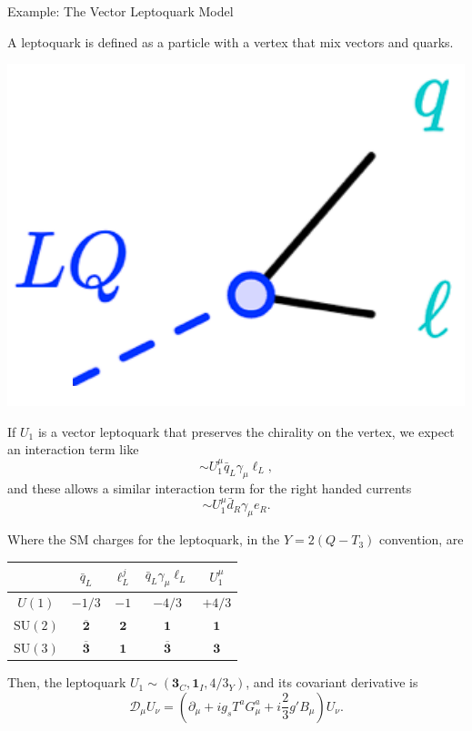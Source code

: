 \documentclass{../bredelebeamer}
\begin{document}
\begin{frame}{Example: The Vector Leptoquark Model}
    \begin{multicols}{2}
        A leptoquark is defined as a particle with a vertex that mix vectors and quarks.
        \begin{center}
        \includegraphics[width=.25\textwidth]{../2023_paper/LQ_vertex.png}
        \end{center}
        If $U_1$ is a vector leptoquark that preserves the chirality on the vertex, we expect an interaction term like
        $$
        \sim U_1^\mu\bar{q}_{L} \gamma_{\mu} \ell_{L},
        $$
        and these allows a similar interaction term for the right handed currents 
        $$
        \sim U_1^\mu\bar{d}_{R} \gamma_{\mu} e_{R}.
        $$
    
        \end{multicols}
        Where the SM charges for the leptoquark, in the $Y=2(Q-T_3)$ convention, are
        \begin{center}
            \begin{tabular}{|c|c|c|c|c|}
                \hline & $\bar{q}_{L}$ & $\ell_{L}^{j}$ & $\bar{q}_{L}\gamma_{\mu} \ell_{L}$ & $U_{1}^{\mu}$ \\
                \hline$U(1)$ & $-1 / 3$ & $-1 $ & $-4 / 3$ & $+4 / 3$ \\
                \hline $\mathrm{SU}(2)$ & $\overline{\mathbf 2}$ & $\mathbf{2}$ & $\mathbf{1}$ & $\mathbf{1}$ \\
                \hline $\mathrm{SU}(3)$ & $\overline{\mathbf 3}$ & $\mathbf{1}$ & $\overline{\mathbf3}$ & $\mathbf{3}$ \\
                \hline
            \end{tabular}	
        \end{center}
        Then, the leptoquark $U_1 \sim \left(\mathbf{3}_{C}, \mathbf{1}_{I}, 4 / 3_{Y}\right)$, and its covariant derivative is
        $$
        \mathcal{D}_\mu U_\nu = \left(\partial_\mu+i g_s T^a G_\mu^a+ i \frac{2}{3} g' B_\mu \right)U_\nu.
        $$
\end{frame}
\end{document}
